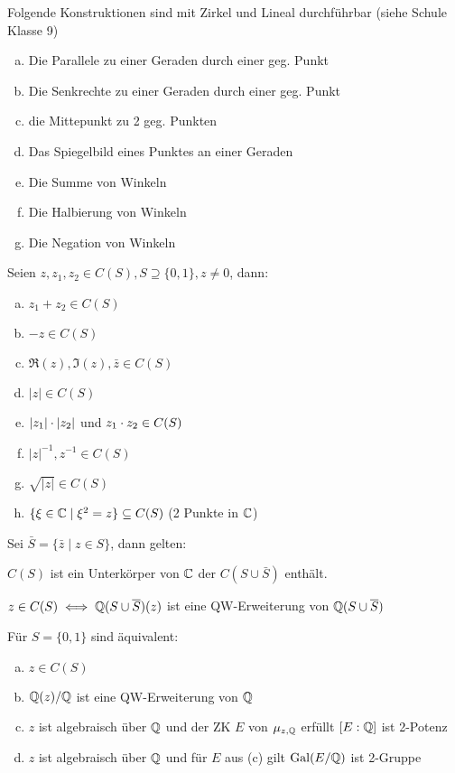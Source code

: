 \documentclass[a4paper]{report}
\begin{document}
\begin{bsp}Folgende Konstruktionen sind mit Zirkel und Lineal durchführbar (siehe Schule Klasse 9)
  \begin{enumerate}[(a)]
    \item Die Parallele zu einer Geraden durch einer geg. Punkt
    \item Die Senkrechte zu einer Geraden durch einer geg. Punkt
    \item die Mittepunkt zu 2 geg. Punkten
    \item Das Spiegelbild eines Punktes an einer Geraden
    \item Die Summe von Winkeln
    \item Die Halbierung von Winkeln
    \item Die Negation von Winkeln
  \end{enumerate}
\end{bsp}
\begin{lemm}
  Seien $z, z_{1}, z_{2} \in C(S), S \supseteq \{0,1\}, z \ne 0$, dann:
  \begin{enumerate}[(a)]
    \item $z_{1} + z_{2} \in C(S)$
    \item $-z \in C(S)$
    \item $\Re(z), \Im(z), \bar z \in C(S)$
    \item $|z| \in C(S)$
    \item $|z_{1}| \cdot |z_{2}|$ und $z_{1}\cdot z_{2} \in C(S)$
    \item $|z|^{-1}, z^{-1} \in C(S)$
    \item $\sqrt {|z|} \in C(S)$
          \item $\{\xi \in \mathbb{C} \mid \xi^{2} = z\} \subseteq C(S)$ (2 Punkte in $\mathbb{C}$)
  \end{enumerate}
\end{lemm}
\begin{satz}
  Sei $\bar S = \{\bar z \mid z \in S\}$, dann gelten:
  \item $C(S)$ ist ein Unterkörper von $\mathbb{C}$ der $C(S \cup \bar S)$ enthält.
  \item $z \in C(S) \iff \mathbb{Q}(S \cup \overline S)(z)$ ist eine QW-Erweiterung von $\mathbb{Q}(S \cup \overline S)$
\end{satz}
\begin{kor}
  Für $S = \{0,1\}$ sind äquivalent:
  \begin{enumerate}[(a)]
    \item $z \in C(S)$
    \item $\mathbb{Q}(z)/\mathbb{Q}$ ist eine QW-Erweiterung von $\mathbb{Q}$
    \item $z$ ist algebraisch über $\mathbb{Q}$ und der ZK $E$ von $\mu_{z, \mathbb{Q}}$ erfüllt $[E:\mathbb{Q}]$ ist 2-Potenz
          \item $z$ ist algebraisch über $\mathbb{Q}$ und für $E$ aus (c) gilt $\operatorname{Gal}(E/\mathbb{Q})$ ist 2-Gruppe
  \end{enumerate}
\end{kor}
\end{document}
